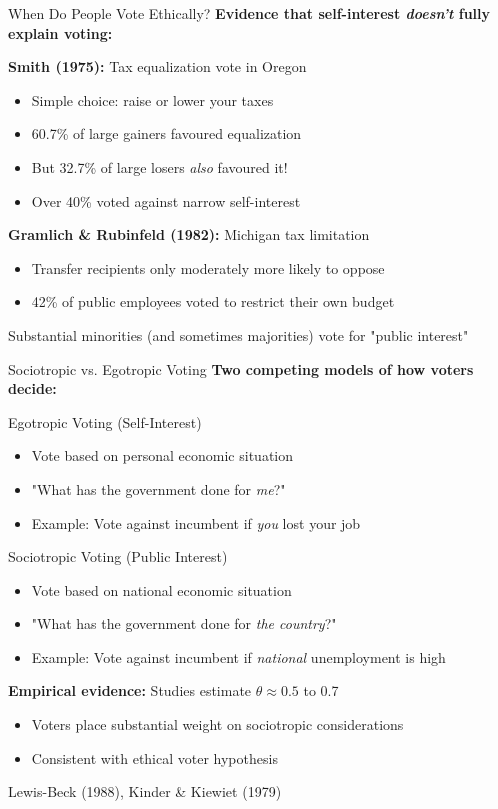 \documentclass[10pt]{beamer}
\begin{document}
\begin{frame}{When Do People Vote Ethically?}
\textbf{Evidence that self-interest \emph{doesn't} fully explain voting:}


\textbf{Smith (1975):} Tax equalization vote in Oregon
\begin{itemize}
\item Simple choice: raise or lower your taxes
\item 60.7\% of large gainers favoured equalization
\item But 32.7\% of large losers \emph{also} favoured it!
\item Over 40\% voted against narrow self-interest
\end{itemize}


\textbf{Gramlich \& Rubinfeld (1982):} Michigan tax limitation
\begin{itemize}
\item Transfer recipients only moderately more likely to oppose
\item 42\% of public employees voted to restrict their own budget
\end{itemize}


Substantial minorities (and sometimes majorities) vote for "public interest"
\end{frame}

\begin{frame}{Sociotropic vs. Egotropic Voting}
\textbf{Two competing models of how voters decide:}


\begin{block}{Egotropic Voting (Self-Interest)}
\begin{itemize}
\item Vote based on personal economic situation
\item "What has the government done for \emph{me}?"
\item Example: Vote against incumbent if \emph{you} lost your job
\end{itemize}
\end{block}

\begin{block}{Sociotropic Voting (Public Interest)}
\begin{itemize}
\item Vote based on national economic situation
\item "What has the government done for \emph{the country}?"
\item Example: Vote against incumbent if \emph{national} unemployment is high
\end{itemize}
\end{block}


\textbf{Empirical evidence:} Studies estimate $\theta \approx 0.5$ to 0.7
\begin{itemize}
\item Voters place substantial weight on sociotropic considerations
\item Consistent with ethical voter hypothesis
\end{itemize}

\footnotesize{Lewis-Beck (1988), Kinder \& Kiewiet (1979)}
\end{frame}
\end{document}
